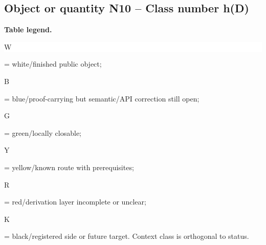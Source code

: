 \subsection*{Object or quantity N10 -- Class number h(D)}
\hypertarget{objproof:N10}{}
\par\smallskip\noindent\begin{minipage}{0.99\linewidth}\footnotesize\raggedright\textbf{Table legend.} \colorbox{white}{\strut W} = white/finished public object; \colorbox{cyan!20}{\strut B} = blue/proof-carrying but semantic/API correction still open; \colorbox{green!18}{\strut G} = green/locally closable; \colorbox{yellow!25}{\strut Y} = yellow/known route with prerequisites; \colorbox{red!20}{\strut R} = red/derivation layer incomplete or unclear; \colorbox{black!18}{\strut K} = black/registered side or future target. Context class is orthogonal to status.\end{minipage}\par\vspace{0.25em}
